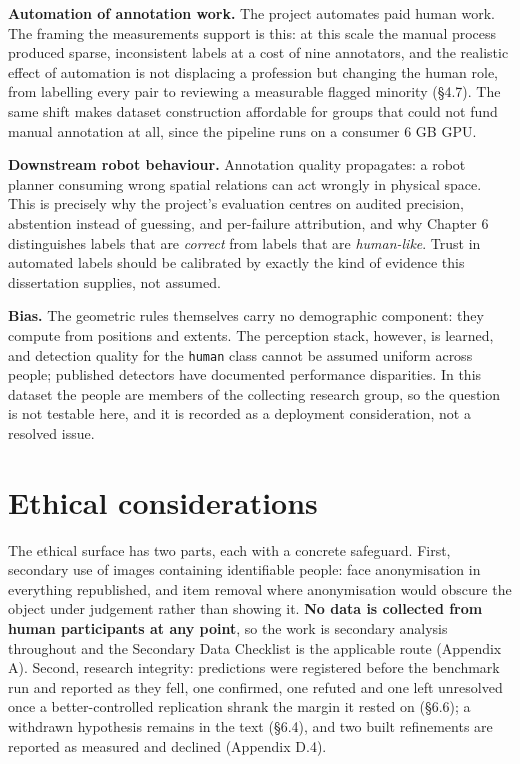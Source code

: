 \textbf{Automation of annotation work.} The project automates paid human work. The framing the measurements support is this: at this scale the manual process produced sparse, inconsistent labels at a cost of nine annotators, and the realistic effect of automation is not displacing a profession but changing the human role, from labelling every pair to reviewing a measurable flagged minority (\S{}4.7). The same shift makes dataset construction affordable for groups that could not fund manual annotation at all, since the pipeline runs on a consumer 6 GB GPU.

\textbf{Downstream robot behaviour.} Annotation quality propagates: a robot planner consuming wrong spatial relations can act wrongly in physical space. This is precisely why the project's evaluation centres on audited precision, abstention instead of guessing, and per-failure attribution, and why Chapter 6 distinguishes labels that are \textit{correct} from labels that are \textit{human-like}. Trust in automated labels should be calibrated by exactly the kind of evidence this dissertation supplies, not assumed.

\textbf{Bias.} The geometric rules themselves carry no demographic component: they compute from positions and extents. The perception stack, however, is learned, and detection quality for the \texttt{human} class cannot be assumed uniform across people; published detectors have documented performance disparities. In this dataset the people are members of the collecting research group, so the question is not testable here, and it is recorded as a deployment consideration, not a resolved issue.

\section{Ethical considerations}

The ethical surface has two parts, each with a concrete safeguard. First, secondary use of images containing identifiable people: face anonymisation in everything republished, and item removal where anonymisation would obscure the object under judgement rather than showing it. \textbf{No data is collected from human participants at any point}, so the work is secondary analysis throughout and the Secondary Data Checklist is the applicable route (Appendix A). Second, research integrity: predictions were registered before the benchmark run and reported as they fell, one confirmed, one refuted and one left unresolved once a better-controlled replication shrank the margin it rested on (\S{}6.6); a withdrawn hypothesis remains in the text (\S{}6.4), and two built refinements are reported as measured and declined (Appendix D.4).

